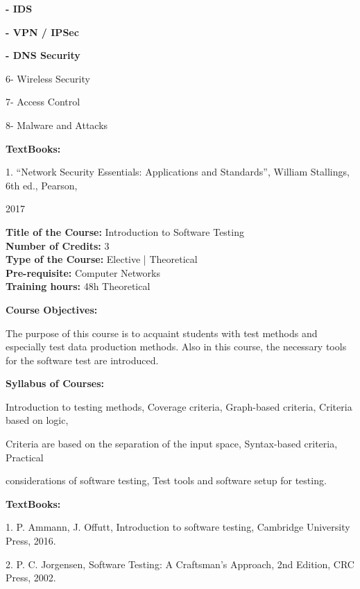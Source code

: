 \documentclass[12pt,a4paper]{article}
\begin{document}
\vspace{2pt}\textbf{- IDS}\par
\vspace{2pt}\textbf{- VPN / IPSec}\par
\vspace{2pt}\textbf{- DNS Security}\par
6- Wireless Security\par
7- Access Control\par
8- Malware and Attacks\par\vspace{4pt}
\textbf{TextBooks:}\par\vspace{2pt}
1. “Network Security Essentials: Applications and Standards”, William Stallings, 6th ed., Pearson,\par
2017\par
\vspace{4pt}

\newpage
\textbf{Title of the Course:} Introduction to Software Testing\\
\textbf{Number of Credits:} 3\\
\textbf{Type of the Course:} Elective | Theoretical\\
\textbf{Pre-requisite:} Computer Networks\\
\textbf{Training hours:} 48h Theoretical\par\vspace{4pt}
\textbf{Course Objectives:}\par\vspace{2pt}
The purpose of this course is to acquaint students with test methods and especially test data
production methods. Also in this course, the necessary tools for the software test are introduced.\par\vspace{4pt}
\textbf{Syllabus of Courses:}\par\vspace{2pt}
Introduction to testing methods, Coverage criteria, Graph-based criteria, Criteria based on logic,\par
Criteria are based on the separation of the input space, Syntax-based criteria, Practical\par
considerations of software testing, Test tools and software setup for testing.\par\vspace{4pt}
\textbf{TextBooks:}\par\vspace{2pt}
1. P. Ammann, J. Offutt, Introduction to software testing, Cambridge University Press, 2016.\par
2. P. C. Jorgensen, Software Testing: A Craftsman's Approach, 2nd Edition, CRC Press, 2002.\par
\vspace{4pt}
\end{document}
